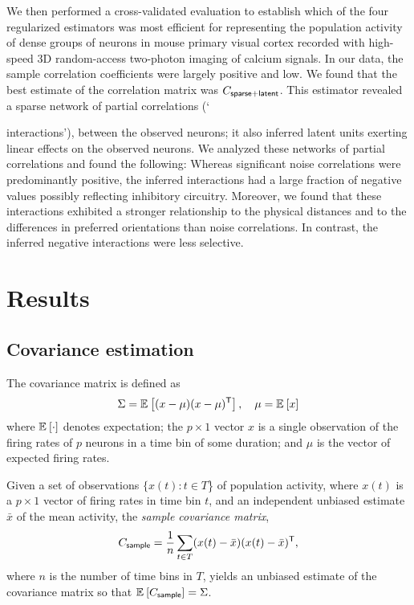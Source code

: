 We then performed a cross-validated evaluation to establish which of the four regularized estimators was most efficient for representing the population activity of dense groups of neurons in mouse primary visual cortex recorded with high-speed 3D random-access two-photon imaging of calcium signals. In our data, the sample correlation coefficients were largely positive and low.  We found that the best estimate of the correlation matrix was $C_{\sf sparse+latent}$.  This estimator revealed a sparse network of partial correlations (`{interactions'), between the observed neurons; it also inferred latent units exerting linear effects on the observed neurons. We analyzed these networks of partial correlations and found the following: Whereas significant noise correlations were predominantly positive, the inferred interactions had a large fraction of negative values possibly reflecting inhibitory circuitry.  Moreover, we found that these interactions exhibited a stronger relationship to the physical distances and to the differences in preferred orientations than noise correlations. In contrast, the inferred negative interactions were less selective.




\section*{Results}
\subsection*{Covariance estimation}
The covariance matrix is defined as
\begin{equation}\label{eq:true-covariance}
    \Sigma = \mathbb E_{}\left[ (x-\mu)(x-\mu)^{\sf T}\right],\quad \mu = \mathbb E_{}\left[ x\right]
    \end{equation}
    where $\mathbb E_{}\left[ \cdot\right]$ denotes expectation; the $p\times 1$ vector $x$ is a single observation of the firing rates of $p$ neurons in a time bin of some duration; and $\mu$ is the vector of expected firing rates. 

Given a set of observations $\{x(t): t\in T$\} of population activity, where $x(t)$ is a $p\times 1$ vector of firing rates in time bin $t$, and an independent unbiased estimate $\bar x$ of the mean activity, the \emph{sample covariance matrix},
\begin{equation}\label{eq:sample}
    C_{\sf sample} = \frac 1 n \sum\limits_{t\in T} (x(t)-\bar x)(x(t)-\bar x)^{\sf T},
    \end{equation}
where $n$ is the number of time bins in $T$, yields an unbiased estimate of the covariance matrix so that $\mathbb E_{}\left[ C_{\sf sample}\right]=\Sigma$.

}
